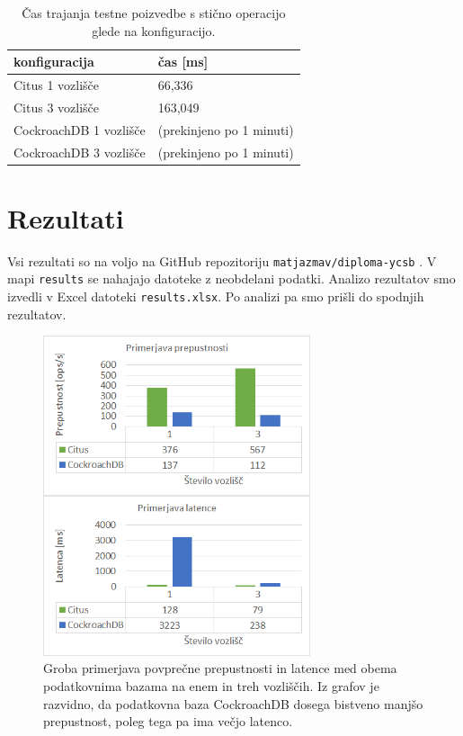 \documentclass[a4paper, 12pt]{book}
\begin{document}
\begin{table}[H]
\begin{center}
\begin{tabular}{ l|l } 
\textbf{konfiguracija} & \textbf{čas [ms]} \\
\hline
Citus 1 vozlišče        & 66,336 \\
Citus 3 vozlišče        & 163,049 \\
CockroachDB 1 vozlišče  & (prekinjeno po 1 minuti)\\
CockroachDB 3 vozlišče  & (prekinjeno po 1 minuti)\\
\end{tabular}
\end{center}
\caption{Čas trajanja testne poizvedbe s stično operacijo glede na konfiguracijo.}
\label{tbl_benchmarking_joins}
\end{table}

\newpage

\section{Rezultati}
Vsi rezultati so na voljo na GitHub repozitoriju \texttt{matjazmav/diploma-ycsb} \cite{matjazmav/diploma-ycsb}. V mapi \texttt{results} se nahajajo datoteke z neobdelani podatki. Analizo rezultatov smo izvedli v Excel datoteki \texttt{results.xlsx}. Po analizi pa smo prišli do spodnjih rezultatov.

\begin{figure}[H]
\begin{center}
\includegraphics[width=0.7\textwidth]{resources/top-level-comparison.png}
\end{center}
\caption{Groba primerjava povprečne prepustnosti in latence med obema podatkovnima bazama na enem in treh vozliščih. Iz grafov je razvidno, da podatkovna baza CockroachDB dosega bistveno manjšo prepustnost, poleg tega pa ima večjo latenco.}
\label{img_ycsb_results_top_level_comparison}
\end{figure}
\end{document}
